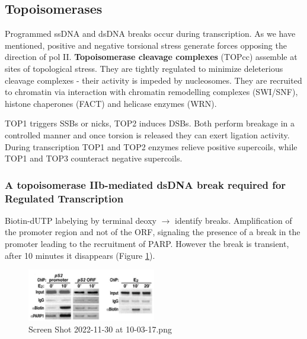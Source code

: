 \hypertarget{topoisomerases}{%
\subsection{Topoisomerases}\label{topoisomerases}}

Programmed ssDNA and dsDNA breaks occur during transcription. As we have mentioned, positive and negative torsional stress generate forces opposing the direction of pol II. \textbf{Topoisomerase cleavage complexes} (TOPcc) assemble at sites of topological stress. They are tightly regulated to minimize deleterious cleavage complexes - their activity is impeded by nucleosomes. They are recruited to chromatin via interaction with chromatin remodelling complexes (SWI/SNF), histone chaperones (FACT) and helicase enzymes (WRN).

TOP1 triggers SSBs or nicks, TOP2 induces DSBs. Both perform breakage in a controlled manner and once torsion is released they can exert ligation activity. During transcription TOP1 and TOP2 enzymes relieve positive supercoils, while TOP1 and TOP3 counteract negative supercoils.

\hypertarget{a-topoisomerase-iib-mediated-dsdna-break-required-for-regulated-transcription}{%
\subsubsection{A topoisomerase IIb-mediated dsDNA break required for Regulated Transcription}\label{a-topoisomerase-iib-mediated-dsdna-break-required-for-regulated-transcription}}

Biotin-dUTP labelying by terminal deoxy $\rightarrow$ identify breaks. Amplification of the promoter region and not of the ORF, signaling the presence of a break in the promoter leading to the recruitment of PARP. However the break is transient, after 10 minutes it disappears (Figure \ref{fig:biot}).

\begin{figure}
\centering
\includegraphics[width=0.5\textwidth]{../_resources/Screen_Shot_2022-11-30_at_10-03-17.png}
\caption{Screen Shot 2022-11-30 at 10-03-17.png}
\label{fig:biot}
\end{figure}


